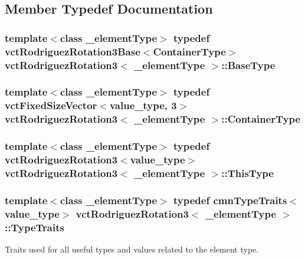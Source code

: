 \subsection{Member Typedef Documentation}
\hypertarget{classvct_rodriguez_rotation3_a9808e8703a58127607921c08914bda40}{
\subsubsection[{Base\-Type}]{\setlength{\rightskip}{0pt plus 5cm}template$<$class \-\_\-element\-Type$>$ typedef {\bf vct\-Rodriguez\-Rotation3\-Base}$<${\bf Container\-Type}$>$ {\bf vct\-Rodriguez\-Rotation3}$<$ \-\_\-element\-Type $>$\-::{\bf Base\-Type}}}\label{classvct_rodriguez_rotation3_a9808e8703a58127607921c08914bda40}
\hypertarget{classvct_rodriguez_rotation3_a14522bb406d3c5c520025d6f1c5f0a82}{
\subsubsection[{Container\-Type}]{\setlength{\rightskip}{0pt plus 5cm}template$<$class \-\_\-element\-Type$>$ typedef {\bf vct\-Fixed\-Size\-Vector}$<$value\-\_\-type, 3$>$ {\bf vct\-Rodriguez\-Rotation3}$<$ \-\_\-element\-Type $>$\-::{\bf Container\-Type}}}\label{classvct_rodriguez_rotation3_a14522bb406d3c5c520025d6f1c5f0a82}
\hypertarget{classvct_rodriguez_rotation3_ae212ce4b566eec4c0083226a64ffd0de}{
\subsubsection[{This\-Type}]{\setlength{\rightskip}{0pt plus 5cm}template$<$class \-\_\-element\-Type$>$ typedef {\bf vct\-Rodriguez\-Rotation3}$<$value\-\_\-type$>$ {\bf vct\-Rodriguez\-Rotation3}$<$ \-\_\-element\-Type $>$\-::{\bf This\-Type}}}\label{classvct_rodriguez_rotation3_ae212ce4b566eec4c0083226a64ffd0de}
\hypertarget{classvct_rodriguez_rotation3_a3b8344626fa072324c1dd4e2384f254f}{
\subsubsection[{Type\-Traits}]{\setlength{\rightskip}{0pt plus 5cm}template$<$class \-\_\-element\-Type$>$ typedef {\bf cmn\-Type\-Traits}$<$value\-\_\-type$>$ {\bf vct\-Rodriguez\-Rotation3}$<$ \-\_\-element\-Type $>$\-::{\bf Type\-Traits}}}\label{classvct_rodriguez_rotation3_a3b8344626fa072324c1dd4e2384f254f}
Traits used for all useful types and values related to the element type. 

